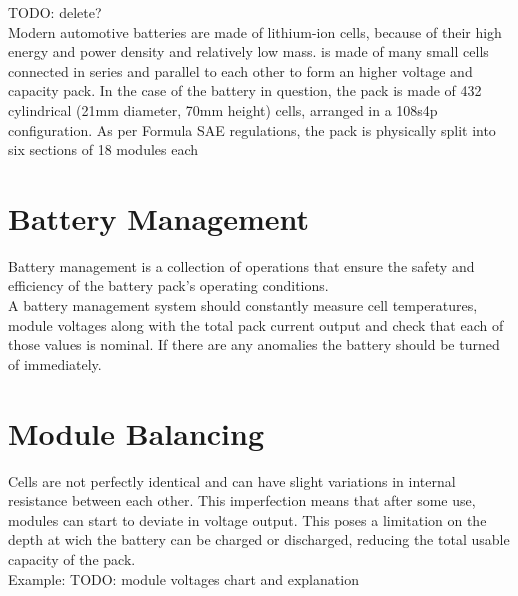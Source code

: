TODO: delete?\\
Modern automotive batteries are made of lithium-ion cells, because of their high energy and power density and relatively low mass.
is made of many small cells connected in series and parallel to each other to form an higher voltage and capacity pack. In the case of the battery in question, the pack is made of 432 cylindrical (21mm diameter, 70mm height) cells, arranged in a 108s4p configuration. As per Formula SAE regulations, the pack is physically split into six sections of 18 modules each

\section{Battery Management}
Battery management is a collection of operations that ensure the safety and efficiency of the battery pack's operating conditions.\\
A battery management system should constantly measure cell temperatures, module voltages along with the total pack current output and check that each of those values is nominal. If there are any anomalies the battery should be turned of immediately.


\section {Module Balancing}
Cells are not perfectly identical and can have slight variations in internal resistance between each other. This imperfection means that after some use, modules can start to deviate in voltage output. This poses a limitation on the depth at wich the battery can be charged or discharged, reducing the total usable capacity of the pack.\\
Example:
TODO: module voltages chart and explanation


